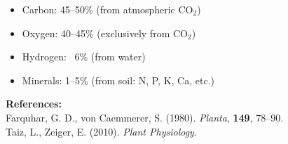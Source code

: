\begin{technical}
\begin{itemize}[leftmargin=*]
  \item Carbon: 45–50\% (from atmospheric $\mathrm{CO}_2$)
  \item Oxygen: 40–45\% (exclusively from $\mathrm{CO}_2$)
  \item Hydrogen: ~6\% (from water)
  \item Minerals: 1–5\% (from soil: N, P, K, Ca, etc.)
\end{itemize}

\noindent\textbf{References:}\\
Farquhar, G. D., von Caemmerer, S. (1980). \textit{Planta}, \textbf{149}, 78–90.\\
Taiz, L., Zeiger, E. (2010). \textit{Plant Physiology}.
\end{technical}
